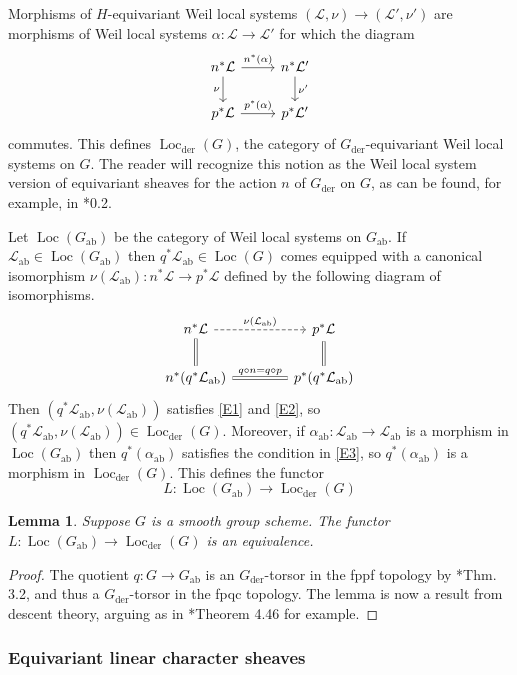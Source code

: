 \documentclass[10pt]{amsart}
\theoremstyle{plain}
\newtheorem{lemma}[theorem]{Lemma}
\theoremstyle{definition}
\DeclareMathOperator{\Loc}{Loc}
\newcommand{\der}{_{\operatorname{der}}}
\newcommand{\ab}{_{\operatorname{ab}}}
\newcommand{\cs}[1]{{\mathcal{#1}}}
\begin{document}
Morphisms of $H$-equivariant Weil local systems $(\cs{L},\nu)\to (\cs{L}',\nu')$ are morphisms of Weil local systems $\alpha: \cs{L}\to \cs{L}'$ for which the diagram
\begin{equation}\label{E3}
\begin{tikzcd}
\arrow{d}[swap]{\nu} n^*\cs{L} \arrow{r}{n^*(\alpha)} & n^*\cs{L}' \arrow{d}{\nu'} \\
p^*\cs{L} \arrow{r}{p^*(\alpha)} & p^*\cs{L}'
\end{tikzcd}
\end{equation}
commutes.
This defines $\Loc\der(G)$, the category of $G\der$-equivariant Weil local systems on $G$.
The reader will recognize this notion as the Weil local system version of equivariant sheaves for the action $n$ of $G\der$ on $G$, as can be found, for example, in \cite{bernstein-lunts:equivariant}*{0.2}. 

Let $\Loc(G\ab)$ be the category of Weil local systems on $G\ab$.
If $\cs{L}\ab\in \Loc(G\ab)$ then $q^*\cs{L}\ab\in \Loc(G)$ comes equipped with a canonical isomorphism $\nu(\cs{L}\ab) : n^* \cs{L} \to p^* \cs{L}$ defined by the following diagram of isomorphisms.
\[
\begin{tikzcd}[column sep=40]
n^*\cs{L} \arrow[equal]{d} \arrow[dashed]{r}{\nu(\cs{L}\ab)} &  \arrow[equal]{d} p^*\cs{L} \\
n^* ( q^*\cs{L}\ab) \arrow[equal]{r}{q\circ n = q\circ p}
& p^* (q^*\cs{L}\ab)
\end{tikzcd}
\]
Then $(q^*\cs{L}\ab,\nu(\cs{L}\ab))$ satisfies \eqref{E1} and \eqref{E2}, so $(q^*\cs{L}\ab,\nu(\cs{L}\ab)) \in \Loc\der(G)$.
Moreover, if $\alpha\ab : \cs{L}\ab \to \cs{L}\ab$ is a morphism in $\Loc(G\ab)$ then $q^*(\alpha\ab)$ satisfies the condition in \eqref{E3}, so $q^*(\alpha\ab)$ is a morphism in $\Loc\der(G)$.
This defines the functor
\[
L : \Loc(G\ab)\to \Loc\der(G)
\]

\begin{lemma}\label{lemma:descent}
Suppose $G$ is a smooth group scheme.  
The functor $L : \Loc(G\ab)\to \Loc\der(G)$ is an equivalence.
\end{lemma}
\begin{proof}
The quotient $q : G \to G\ab$ is an $G\der$-torsor in the fppf topology by \cite{demazure:SGA3-VIA}*{Thm. 3.2}, and thus a $G\der$-torsor in the fpqc topology.
The lemma is now a result from descent theory, arguing as in \cite{Vistoli:notes}*{Theorem 4.46} for example. 
\end{proof}

\subsubsection{Equivariant linear character sheaves}\label{ssec:equivariant2}
\end{document}

